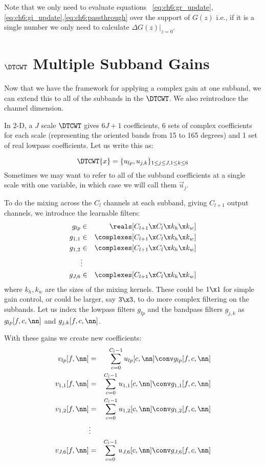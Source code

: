 Note that we only need to evaluate equations
~\ref{eq:ch6:gr_update},\ref{eq:ch6:gi_update},\ref{eq:ch6:passthrough} over the
support of $G(z)$ i.e., if it is a single number we only need to calculate
$\left.\Delta G(z)\right\rvert_{z=0}$.



\section{$\DTCWT$ Multiple Subband Gains}\label{sec:ch6:multiple_subbands}

Now that we have the framework for applying a complex gain at one subband, we
can extend this to all of the subbands in the $\DTCWT$. We also reintroduce the channel
dimension. 

In 2-D, a $J$ scale $\DTCWT$ gives $6J+1$ coefficients, 6 sets of complex
coefficients for each scale (representing the oriented bands from 15 to 165
degrees) and 1 set of real lowpass coefficients. Let us write this as:

\begin{equation}
  \DTCWT\{x\} = \{u_{lp}, u_{j,k} \}_{1\leq j\leq J, 1\leq k\leq 6}
  \label{eq:ch6:wave_coeffs}
\end{equation}
%
Sometimes we may want to refer to all of the subband coefficients at a single scale
with one variable, in which case we will call them $\vec{u}_{j}$.

To do the mixing across the $C_l$ channels at each subband, giving $C_{l+1}$
output channels, we introduce the learnable filters:
%
\begin{eqnarray}
  g_{lp} &\in& \reals[C_{l+1}\x C_l\x k_h\x k_w] \label{eq:ch6:glp} \\
  g_{1,1} &\in& \complexes[C_{l+1}\x C_l\x k_h\x k_w] \\
  g_{1,2} &\in& \complexes[C_{l+1}\x C_l\x k_h\x k_w] \\
      & \vdots &\\
  g_{J,6} &\in& \complexes[C_{l+1}\x C_l\x k_h\x k_w]  \label{eq:ch6:gj6}
\end{eqnarray}
%
where $k_h, k_w$ are the sizes of the mixing kernels. These could be $1\x 1$ for
simple gain control, or could be larger, say $3\x 3$, to do more complex
filtering on the subbands. Let us index the lowpass filters $g_{lp}$ and the
bandpass filters $g_{j,k}$ as $g_{lp}[f, c, \nn]$ and $g_{j,k}[f, c, \nn]$.

With these gains we create new coefficients:
\begin{eqnarray}
  v_{lp}[f, \nn] &= & \sum_{c=0}^{C_l-1} u_{lp}[c, \nn] \conv g_{lp}[f, c, \nn] \\
  v_{1,1}[f, \nn] &= & \sum_{c=0}^{C_l-1} u_{1,1}[c, \nn] \conv g_{1,1}[f, c, \nn] \\
  v_{1,2}[f, \nn] &= & \sum_{c=0}^{C_l-1} u_{1,2}[c, \nn] \conv g_{1,2}[f, c, \nn] \\
                  & \vdots & \\
  v_{J,6}[f, \nn] &= & \sum_{c=0}^{C_l-1} u_{J,6}[c, \nn] \conv g_{J,6}[f, c, \nn] 
\end{eqnarray}

